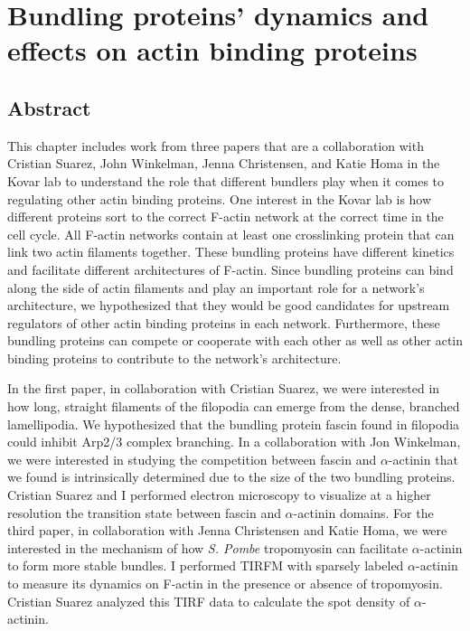 \chapter{Bundling proteins' dynamics and effects on actin binding proteins}\label{ch:abp-bundle}

\section[Abstract]{Abstract\footnotemark}

This chapter includes work from three papers that are a collaboration with Cristian Suarez, John Winkelman, Jenna Christensen, and Katie Homa in the Kovar lab to understand the role that different bundlers play when it comes to regulating other actin binding proteins. One interest in the Kovar lab is how different proteins sort to the correct F-actin network at the correct time in the cell cycle. All F-actin networks contain at least one crosslinking protein that can link two actin filaments together. These bundling proteins have different kinetics and facilitate different architectures of F-actin. Since bundling proteins can bind along the side of actin filaments and play an important role for a network's architecture, we hypothesized that they would be good candidates for upstream regulators of other actin binding proteins in each network. Furthermore, these bundling proteins can compete or cooperate with each other as well as other actin binding proteins to contribute to the network's architecture. 

In the first paper, in collaboration with Cristian Suarez, we were interested in how long, straight filaments of the filopodia can emerge from the dense, branched lamellipodia. We hypothesized that the bundling protein fascin found in filopodia could inhibit Arp2/3 complex branching. In a collaboration with Jon Winkelman, we were interested in studying the competition between fascin and $\alpha$-actinin that we found is intrinsically determined due to the size of the two bundling proteins. Cristian Suarez and I performed electron microscopy to visualize at a higher resolution the transition state between fascin and $\alpha$-actinin domains. For the third paper, in collaboration with Jenna Christensen and Katie Homa, we were interested in the mechanism of how \textit{S. Pombe} tropomyosin can facilitate $\alpha$-actinin to form more stable bundles. I performed TIRFM with sparsely labeled $\alpha$-actinin to measure its dynamics on F-actin in the presence or absence of tropomyosin. Cristian Suarez analyzed this TIRF data to calculate the spot density of $\alpha$-actinin.


